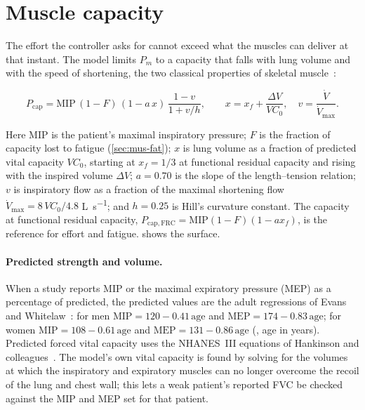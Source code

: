 \section{Muscle capacity}
\label{sec:mus-cap}
The effort the controller asks for cannot exceed what the muscles can deliver at that instant. The model limits $P_m$ to a capacity that falls with lung volume and with the speed of shortening, the two classical properties of skeletal muscle~\citep{hill1938,braun1982}:
\begin{keyequation}
\begin{equation}
P_{\mathrm{cap}} = \mathrm{MIP}\,(1-F)\,(1 - a\,x)\,\frac{1 - v}{1 + v/h},
\qquad x = x_f + \frac{\Delta V}{VC_0},\quad v = \frac{\dot V}{\dot V_{\max}}.
\label{eq:mus-cap}
\end{equation}
\end{keyequation}
Here MIP is the patient's maximal inspiratory pressure; $F$ is the fraction of capacity lost to fatigue (\cref{sec:mus-fat}); $x$ is lung volume as a fraction of predicted vital capacity $VC_0$, starting at $x_f = 1/3$ at functional residual capacity and rising with the inspired volume $\Delta V$; $a = 0.70$ is the slope of the length--tension relation; $v$ is inspiratory flow as a fraction of the maximal shortening flow $\dot V_{\max} = 8\,VC_0/4.8$ \si{\liter\per\second}; and $h = 0.25$ is Hill's curvature constant. The capacity at functional residual capacity, $P_{\mathrm{cap,FRC}} = \mathrm{MIP}(1-F)(1-a x_f)$, is the reference for effort and fatigue.  shows the surface.

\paragraph{Predicted strength and volume.} When a study reports MIP or the maximal expiratory pressure (MEP) as a percentage of predicted, the predicted values are the adult regressions of Evans and Whitelaw~\citep{evans2009}: for men $\mathrm{MIP} = 120 - 0.41\,\mathrm{age}$ and $\mathrm{MEP} = 174 - 0.83\,\mathrm{age}$; for women $\mathrm{MIP} = 108 - 0.61\,\mathrm{age}$ and $\mathrm{MEP} = 131 - 0.86\,\mathrm{age}$ (\si{\cmH}, age in years). Predicted forced vital capacity uses the NHANES~III equations of Hankinson and colleagues~\citep{hankinson1999}. The model's own vital capacity is found by solving for the volumes at which the inspiratory and expiratory muscles can no longer overcome the recoil of the lung and chest wall; this lets a weak patient's reported FVC be checked against the MIP and MEP set for that patient.

